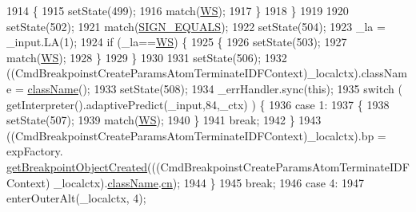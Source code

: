 \begin{DoxyCode}
1914           \{
1915           setState(499);
1916           match(\hyperlink{classgov_1_1nasa_1_1jpf_1_1inspector_1_1server_1_1expression_1_1parser_1_1_expression_grammar_parser_ace44714ae633c7b14794cc5a24d9ebf3}{WS});
1917           \}
1918         \}
1919 
1920         setState(502);
1921         match(\hyperlink{classgov_1_1nasa_1_1jpf_1_1inspector_1_1server_1_1expression_1_1parser_1_1_expression_grammar_parser_a4dc93cc6563a32e75e7006cb71acb7b7}{SIGN\_EQUALS});
1922         setState(504);
1923         \_la = \_input.LA(1);
1924         \textcolor{keywordflow}{if} (\_la==\hyperlink{classgov_1_1nasa_1_1jpf_1_1inspector_1_1server_1_1expression_1_1parser_1_1_expression_grammar_parser_ace44714ae633c7b14794cc5a24d9ebf3}{WS}) \{
1925           \{
1926           setState(503);
1927           match(\hyperlink{classgov_1_1nasa_1_1jpf_1_1inspector_1_1server_1_1expression_1_1parser_1_1_expression_grammar_parser_ace44714ae633c7b14794cc5a24d9ebf3}{WS});
1928           \}
1929         \}
1930 
1931         setState(506);
1932         ((CmdBreakpoinstCreateParamsAtomTerminateIDFContext)\_localctx).className = 
      \hyperlink{classgov_1_1nasa_1_1jpf_1_1inspector_1_1server_1_1expression_1_1parser_1_1_expression_grammar_parser_aafe03b251eef204ae911768faa5fd862}{className}();
1933         setState(508);
1934         \_errHandler.sync(\textcolor{keyword}{this});
1935         \textcolor{keywordflow}{switch} ( getInterpreter().adaptivePredict(\_input,84,\_ctx) ) \{
1936         \textcolor{keywordflow}{case} 1:
1937           \{
1938           setState(507);
1939           match(\hyperlink{classgov_1_1nasa_1_1jpf_1_1inspector_1_1server_1_1expression_1_1parser_1_1_expression_grammar_parser_ace44714ae633c7b14794cc5a24d9ebf3}{WS});
1940           \}
1941           \textcolor{keywordflow}{break};
1942         \}
1943          ((CmdBreakpoinstCreateParamsAtomTerminateIDFContext)\_localctx).bp =  expFactory.
      \hyperlink{classgov_1_1nasa_1_1jpf_1_1inspector_1_1server_1_1expression_1_1_expression_factory_a8a39baba147e3f7159925acc067e3235}{getBreakpointObjectCreated}(((CmdBreakpoinstCreateParamsAtomTerminateIDFContext)
      \_localctx).\hyperlink{classgov_1_1nasa_1_1jpf_1_1inspector_1_1server_1_1expression_1_1parser_1_1_expression_grammar_parser_aafe03b251eef204ae911768faa5fd862}{className}.\hyperlink{classgov_1_1nasa_1_1jpf_1_1inspector_1_1server_1_1expression_1_1parser_1_1_expression_grammar_parser_1_1_class_name_context_adfd3eff7fa59de106f32ddb5f19117e8}{cn}); 
1944         \}
1945         \textcolor{keywordflow}{break};
1946       \textcolor{keywordflow}{case} 4:
1947         enterOuterAlt(\_localctx, 4);

\end{DoxyCode}
